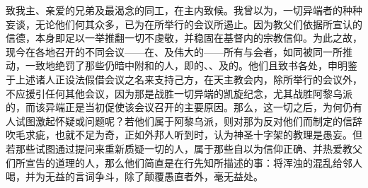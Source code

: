 \par

致我主、亲爱的兄弟及最渴念的同工，在主内致候。我曾以为，一切异端者的种种妄谈，无论他们何其众多，已为在所举行的会议所遏止。因为教父们依据所宣认的信德，本身即足以一举推翻一切不虔敬，并稳固在基督内的宗教信仰。为此之故，现今在各地召开的不同会议——在、及伟大的——所有与会者，如同被同一所推动，一致地绝罚了那些仍暗中附和的人，即的、、及的。他们且致书各处，申明鉴于上述诸人正设法假借会议之名来支持己方，在天主教会内，除所举行的会议外，不应援引任何其他会议，因为那是战胜一切异端的凯旋纪念，尤其战胜阿黎乌派的，而该异端正是当初促使该会议召开的主要原因。那么，这一切之后，为何仍有人试图激起怀疑或问题呢？若他们属于阿黎乌派，则对那为反对他们而制定的信辞吹毛求疵，也就不足为奇，正如外邦人听到时，认为神圣十字架的教理是愚妄。但若那些试图通过提问来重新质疑一切的人，属于那些自以为信仰正确、并热爱教父们所宣告的道理的人，那么他们简直是在行先知所描述的事：将浑浊的混乱给邻人喝，并为无益的言词争斗，除了颠覆愚直者外，毫无益处。\par

